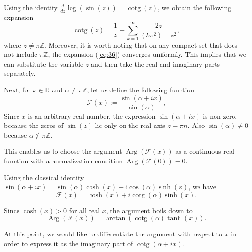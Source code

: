 \documentclass[preprint,12pt,nopreprintline]{elsarticle}
\begin{document}
Using the identity $\frac{d}{dz}\operatorname{log}\left(\operatorname{sin}\left(z\right)\right)=\operatorname{cotg}\left(z\right)$, we obtain the following expansion
\begin{equation}\label{eq:36}
\operatorname{cotg}\left(z\right)=\frac{1}{z}-\sum_{k=1}^{\infty}\frac{2z}{\left(k\pi^2\right)-z^2},
\end{equation}
where $z\neq\pi\mathbb{Z}$. Moreover, it is worth noting that on any compact set that does not include $\pi\mathbb{Z}$, the expansion (\ref{eq:36}) converges uniformly. This implies that we can substitute the variable $z$ and then take the real and imaginary parts separately.

Next, for $x\in\mathbb{R}$ and $\alpha\neq\pi\mathbb{Z}$, let us define the following function
\begin{equation}\label{eq:37}
\mathscr{F}\left(x\right):=\frac{\operatorname{sin}\left(\alpha+ix\right)}{\operatorname{sin}\left(\alpha\right)},
\end{equation}
Since $x$ is an arbitrary real number, the expression $\operatorname{sin}\left(\alpha+ix\right)$ is non-zero, because the zeros of $\operatorname{sin}\left(z\right)$ lie only on the real axis $z=\pi n$. Also $\operatorname{sin}\left(\alpha\right)\neq 0$ because $\alpha\notin\pi\mathbb{Z}$. 

This enables us to choose the argument $\operatorname{Arg}\left(\mathscr{F}\left(x\right)\right)$ as a continuous real function with a normalization condition $\operatorname{Arg}\left(\mathscr{F}\left(0\right)\right)=0$.

Using the classical identity $\operatorname{sin}\left(\alpha+ix\right)=\operatorname{sin}\left(\alpha\right)\operatorname{cosh}\left(x\right)+i\operatorname{cos}\left(\alpha\right)\operatorname{sinh}\left(x\right)$, we have
\begin{equation}\label{eq:38}
\mathscr{F}\left(x\right)=\operatorname{cosh}\left(x\right)+i\operatorname{cotg}\left(\alpha\right)\operatorname{sinh}\left(x\right).
\end{equation}

Since $\operatorname{cosh}\left(x\right)>0$ for all real $x$, the argument boils down to 
\begin{equation}\label{eq:39}
\operatorname{Arg}\left(\mathscr{F}\left(x\right)\right)=\operatorname{arctan}\left(\operatorname{cotg}\left(\alpha\right)\operatorname{tanh}\left(x\right)\right).
\end{equation}

At this point, we would like to differentiate the argument with respect to $x$ in order to express it as the imaginary part of $\operatorname{cotg}\left(\alpha+ix\right)$.
\end{document}
